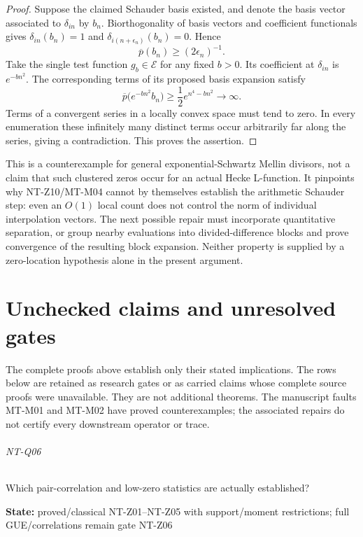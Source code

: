 \documentclass[11pt,a4paper]{article}
\begin{document}
\begin{proof}
Suppose the claimed Schauder basis existed, and denote the basis
vector associated to $\delta_{in}$ by $b_n$. Biorthogonality of
basis vectors and coefficient functionals gives
$\delta_{in}(b_n)=1$ and
$\delta_{i(n+\epsilon_n)}(b_n)=0$. Hence
\[
                 \overline p(b_n)\ge(2\epsilon_n)^{-1}.
\]
Take the single test function $g_b\in\mathcal E$ for any fixed
$b>0$. Its coefficient at $\delta_{in}$ is $e^{-bn^2}$.
The corresponding terms of its proposed basis expansion satisfy
\[
 \overline p\bigl(e^{-bn^2}b_n\bigr)
        \ge\frac12 e^{n^4-bn^2}\longrightarrow\infty.
\]
Terms of a convergent series in a locally convex space must tend
to zero. In every enumeration these infinitely many distinct terms
occur arbitrarily far along the series, giving a contradiction.
This proves the assertion.
\end{proof}

This is a counterexample for general exponential-Schwartz Mellin
divisors, not a claim that such clustered zeros occur for an actual
Hecke L-function. It pinpoints why NT-Z10/MT-M04 cannot by themselves
establish the arithmetic Schauder step: even an $O(1)$ local count
does not control the norm of individual interpolation vectors.
The next possible repair must incorporate quantitative separation,
or group nearby evaluations into divided-difference blocks and prove
convergence of the resulting block expansion. Neither property is
supplied by a zero-location hypothesis alone in the present argument.

\part{Unchecked claims and unresolved gates}
The complete proofs above establish only their stated implications.
The rows below are retained as research gates or as carried claims whose
complete source proofs were unavailable. They are not additional theorems.
The manuscript faults MT-M01 and MT-M02 have proved counterexamples;
the associated repairs do not certify every downstream operator or trace.

\paragraph{NT-Q06} Which pair-correlation and low-zero statistics are actually established?

\textbf{State:} proved/\allowbreak{}classical NT-Z01–\allowbreak{}NT-Z05 with support/\allowbreak{}moment restrictions; full GUE/\allowbreak{}correlations remain gate NT-Z06
\end{document}
